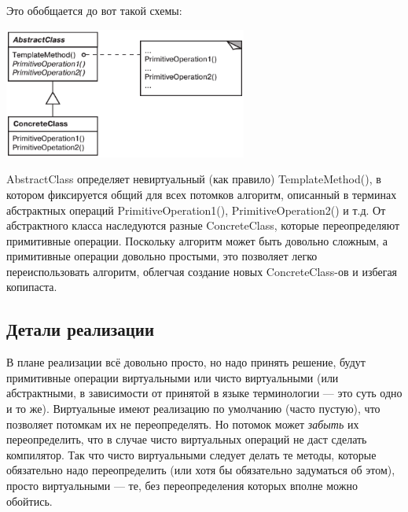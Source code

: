 \documentclass{../../text-style}
\begin{document}
Это обобщается до вот такой схемы:

\begin{center}
    \includegraphics[width=0.6\textwidth]{templateMethod.png}
\end{center}

AbstractClass определяет невиртуальный (как правило) TemplateMethod(), в котором фиксируется общий для всех потомков алгоритм, описанный в терминах абстрактных операций PrimitiveOperation1(), PrimitiveOperation2() и т.д. От абстрактного класса наследуются разные ConcreteClass, которые переопределяют примитивные операции. Поскольку алгоритм может быть довольно сложным, а примитивные операции довольно простыми, это позволяет легко переиспользовать алгоритм, облегчая создание новых ConcreteClass-ов и избегая копипаста.

\subsection{Детали реализации}

В плане реализации всё довольно просто, но надо принять решение, будут примитивные операции виртуальными или чисто виртуальными (или абстрактными, в зависимости от принятой в языке терминологии --- это суть одно и то же). Виртуальные имеют реализацию по умолчанию (часто пустую), что позволяет потомкам их не переопределять. Но потомок может \emph{забыть} их переопределить, что в случае чисто виртуальных операций не даст сделать компилятор. Так что чисто виртуальными следует делать те методы, которые обязательно надо переопределить (или хотя бы обязательно задуматься об этом), просто виртуальными --- те, без переопределения которых вполне можно обойтись.
\end{document}
